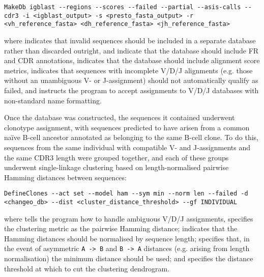 \begin{lstlisting}
MakeDb igblast --regions --scores --failed --partial --asis-calls --cdr3 -i <igblast_output> -s <presto_fasta_output> -r <vh_reference_fasta> <dh_reference_fasta> <jh_reference_fasta>
\end{lstlisting}

\noindent where  indicates that invalid sequences should be included in a separate database rather than discarded outright,  and  indicate that the database should include FR and CDR annotations,  indicates that the database should include alignment score metrics,  indicates that sequences with incomplete V/D/J alignments (e.g. those without an unambiguous V- or J-assignment) should not automatically qualify as failed, and  instructs the program to accept assignments to V/D/J databases with non-standard name formatting.

Once the database was constructed, the sequences it contained underwent clonotype assignment, with sequences predicted to have arisen from a common na\"{i}ve B-cell ancestor annotated as belonging to the same B-cell clone. To do this, sequences from the same individual with compatible V- and J-assignments and the same CDR3 length were grouped together, and each of these groups underwent single-linkage clustering based on length-normalised pairwise Hamming distances between sequences: %

\begin{lstlisting}
DefineClones --act set --model ham --sym min --norm len --failed -d <changeo_db> --dist <cluster_distance_threshold> --gf INDIVIDUAL
\end{lstlisting}

\noindent where  tells the program how to handle ambiguous V/D/J assignments,  specifies the clustering metric as the pairwise Hamming distance;  indicates that the Hamming distances should be normalised by sequence length;  specifies that, in the event of asymmetric \texttt{A -> B} and \texttt{B -> A} distances (e.g. arising from length normalisation) the minimum distance should be used; and  specifies the distance threshold at which to cut the clustering dendrogram.

